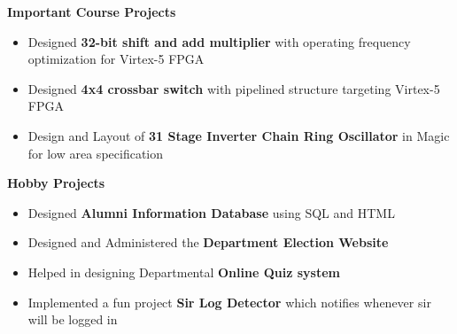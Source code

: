 \documentclass[a4paper,11pt,times]{res}
\newcommand{\smalitem}[1]{\item #1 \vspace{-4pt}}
\newcommand{\resheading}[1]{{\large \colorbox{mygrey}{\begin{minipage}{\textwidth}{\textbf{#1 \vphantom{p\^{E}}}}\end{minipage}}\vspace{4pt}}}
\begin{document}
\resheading{ Important Course Projects}
\begin{itemize}
\smalitem{Designed {\bf 32-bit shift and add multiplier} with operating frequency optimization for  Virtex-5 FPGA}
\smalitem{ Designed {\bf 4x4 crossbar switch} with pipelined structure targeting Virtex-5 FPGA} 
\smalitem{Design and Layout of {\bf 31 Stage Inverter Chain Ring Oscillator} in Magic for low area specification}
\end{itemize}
\newpage
\resheading{Hobby Projects}
\begin{itemize}
\smalitem{Designed  {\bf Alumni Information Database} using SQL and HTML}
\smalitem{Designed and Administered the {\bf Department Election Website} }
\smalitem{Helped in designing  Departmental {\bf Online Quiz system}}
\smalitem{Implemented a fun project {\bf Sir Log Detector} which notifies whenever sir will be logged in}
\end{itemize}
\end{document}
